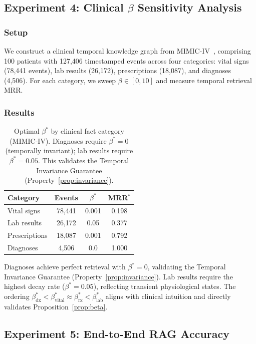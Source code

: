 \documentclass[conference]{IEEEtran}
\begin{document}
\subsection{Experiment 4: Clinical \texorpdfstring{$\beta$}{beta} Sensitivity Analysis}

\subsubsection{Setup}
We construct a clinical temporal knowledge graph from MIMIC-IV~\cite{mimic}, comprising 100 patients with 127,406 timestamped events across four categories: vital signs (78,441 events), lab results (26,172), prescriptions (18,087), and diagnoses (4,506). For each category, we sweep $\beta \in [0, 10]$ and measure temporal retrieval MRR.

\subsubsection{Results}

\begin{table}[t]
\centering
\caption{Optimal $\beta^*$ by clinical fact category (MIMIC-IV). Diagnoses require $\beta^* {=} 0$ (temporally invariant); lab results require $\beta^*{=}0.05$. This validates the Temporal Invariance Guarantee (Property~\ref{prop:invariance}).}
\label{tab:clinical_beta}
\begin{tabular}{@{}lccc@{}}
\toprule
\textbf{Category} & \textbf{Events} & \textbf{$\beta^*$} & \textbf{MRR$^*$} \\
\midrule
Vital signs & 78,441 & 0.001 & 0.198 \\
Lab results & 26,172 & 0.05 & 0.377 \\
Prescriptions & 18,087 & 0.001 & 0.792 \\
Diagnoses & 4,506 & 0.0 & 1.000 \\
\bottomrule
\end{tabular}
\end{table}

Diagnoses achieve perfect retrieval with $\beta^*{=}0$, validating the Temporal Invariance Guarantee (Property~\ref{prop:invariance}). Lab results require the highest decay rate ($\beta^*{=}0.05$), reflecting transient physiological states. The ordering $\beta^*_{\text{dx}} < \beta^*_{\text{vital}} \approx \beta^*_{\text{rx}} < \beta^*_{\text{lab}}$ aligns with clinical intuition and directly validates Proposition~\ref{prop:beta}.

\subsection{Experiment 5: End-to-End RAG Accuracy}
\end{document}
